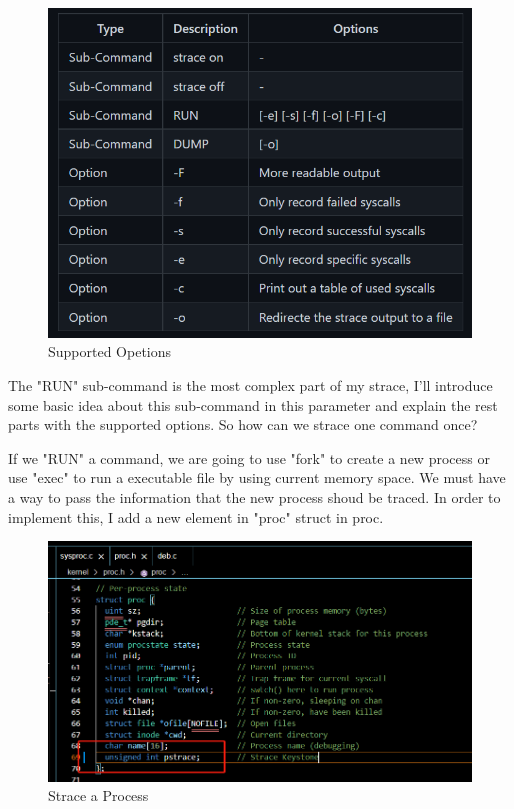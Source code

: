 \documentclass[11pt,oneside,a4paper]{article}
\begin{document}
\begin{figure}[H]
    \includegraphics[width=4.75in]{1-39.png}
    \centering
    \caption{Supported Opetions}
\end{figure}

The "RUN" sub-command is the most complex part of my strace, I'll introduce some 
basic idea about this sub-command in this parameter and explain the rest parts with
the supported options. So how can we strace one command once?

If we "RUN" a command, we are going to use "fork" to create a new process or use 
"exec" to run a executable file by using current memory space. We must have a way to 
pass the information that the new process shoud be traced. In order to implement this,
I add a new element in "proc" struct in proc.

\begin{figure}[H]
    \includegraphics[width=4.75in]{1-15.png}
    \centering
    \caption{Strace a Process}
\end{figure}
\end{document}
